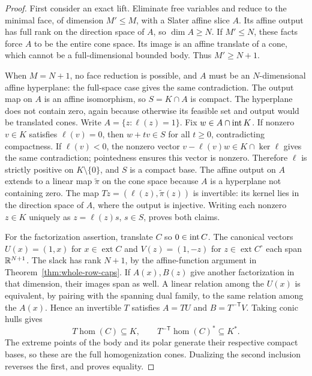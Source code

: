 \begin{proof}
First consider an exact lift. Eliminate free variables and reduce to the
minimal face, of dimension $M'\leq M$, with a Slater affine slice $A$.
Its affine output has full rank on the direction space of $A$, so
$\dim A\geq N$. If $M'\leq N$, these facts force $A$ to be the entire
cone space. Its image is an affine translate of a cone, which cannot
be a full-dimensional bounded body. Thus $M'\geq N+1$.

When $M=N+1$, no face reduction is possible, and $A$ must be an
$N$-dimensional affine hyperplane: the full-space case gives the same
contradiction. The output map on $A$ is an affine isomorphism, so
$S=K\cap A$ is compact. The hyperplane does not contain zero, again
because otherwise its feasible set and output would be translated
cones. Write $A=\{z:\ell(z)=1\}$. Fix $w\in A\cap\operatorname{int} K$.
If nonzero $v\in K$ satisfies $\ell(v)=0$, then $w+tv\in S$ for all
$t\geq0$, contradicting compactness. If $\ell(v)<0$, the nonzero
vector $v-\ell(v)w\in K\cap\ker\ell$ gives the same contradiction;
pointedness ensures this vector is nonzero. Therefore $\ell$ is
strictly positive on $K\setminus\{0\}$, and $S$ is a compact base.
The affine output on $A$ extends to a linear map $\widetilde\pi$ on
the cone space because $A$ is a hyperplane not containing zero. The map
$Tz=(\ell(z),\widetilde\pi(z))$ is invertible: its kernel lies in the
direction space of $A$, where the output is injective. Writing each
nonzero $z\in K$ uniquely as $z=\ell(z)s$, $s\in S$, proves both claims.

For the factorization assertion, translate $C$ so $0\in\operatorname{int} C$.
The canonical vectors $U(x)=(1,x)$ for $x\in\operatorname{ext}C$ and
$V(z)=(1,-z)$ for $z\in\operatorname{ext}C^\circ$ each span
$\mathbb R^{N+1}$. The slack has rank $N+1$, by the affine-function argument
in Theorem~\ref{thm:whole-row-caps}. If $A(x),B(z)$ give another
factorization in that dimension, their images span as well. A linear
relation among the $U(x)$ is equivalent, by pairing with the spanning
dual family, to the same relation among the $A(x)$. Hence an invertible
$T$ satisfies $A=TU$ and $B=T^{-\mathsf T}V$. Taking conic hulls gives
\[
 T\operatorname{hom}(C)\subseteq K,\qquad
 T^{-\mathsf T}\operatorname{hom}(C)^*\subseteq K^*.
\]
The extreme points of the body and its polar generate their respective
compact bases, so these are the full homogenization cones. Dualizing
the second inclusion reverses the first, and proves equality.
\end{proof}

